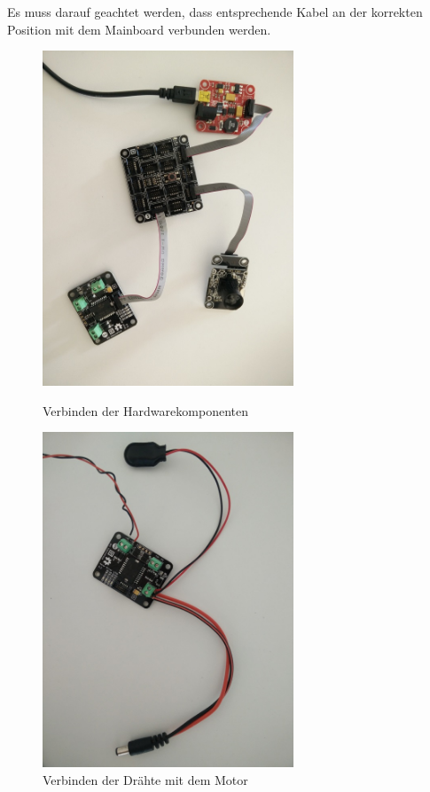 \documentclass[12pt,a4paper]{article}
\begin{document}
Es muss darauf geachtet werden, dass entsprechende Kabel an der korrekten Position mit dem Mainboard verbunden werden.

\begin{figure}[h]
	\begin{minipage}{0.5\textwidth}
		\includegraphics[height=10cm]{./graphics/wiring-all.jpg}
		\caption{Verbinden der Hardwarekomponenten}
	\end{minipage}
	\begin{minipage}{0.5\textwidth}
		\includegraphics[height=10cm]{./graphics/wiring-motor.jpg}
		\caption{Verbinden der Drähte mit dem Motor}
	\end{minipage}
\end{figure}
\end{document}
